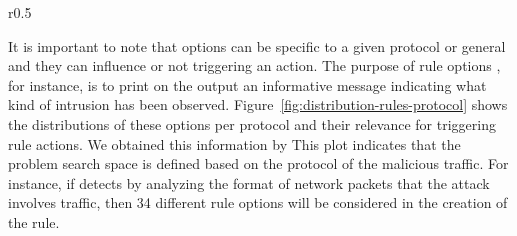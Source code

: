 \documentclass[runningheads]{llncs}
\begin{document}
\begin{wrapfigure}[16]{r}{0.5\textwidth}
  \centering
  \vspace{-5ex}
  \caption{\label{fig:distribution-rules-protocol}Distribution of
    number of rules per protocol and relevance for triggering action.}
\end{wrapfigure}
It is important to note that options can be specific to a given
protocol or general and they can influence or not triggering an
action. The purpose of rule options , for instance, is to
print on the output an informative message indicating what kind of
intrusion has been
observed. Figure~\ref{fig:distribution-rules-protocol} shows the
distributions of these options per protocol and their relevance for
triggering rule actions. We obtained this information
by This plot indicates that the problem search
space is defined based on the protocol of the malicious traffic. For
instance, if \tname{} detects by analyzing the format of network packets that the attack involves 
traffic, then 34 different rule options will be considered in the
creation of the rule.
\end{document}
